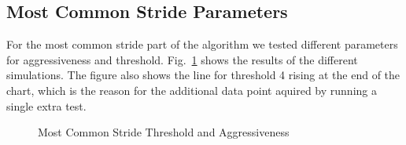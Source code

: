 \subsection{Most Common Stride Parameters}

For the most common stride part of the algorithm we tested different parameters
for aggressiveness and threshold. Fig.~\ref{fig:mcs_tweaks} shows the results
of the different simulations.
The figure also shows the line for threshold 4 rising at the end of the chart,
which is the reason for the additional data point aquired by running a single
extra test.


\begin{figure}
	
	\caption{Most Common Stride Threshold and Aggressiveness}
	\label{fig:mcs_tweaks}
\end{figure}
